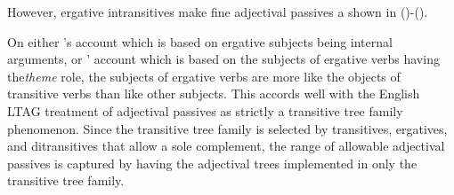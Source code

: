 
However,  ergative intransitives make fine adjectival passives a shown in ()-().



On either \cite{LevinRap}'s account which is based on ergative subjects being internal arguments, or \cite{Bresnan82}' account which is based on the subjects of ergative verbs having the{\it theme} role, the subjects of ergative verbs are more like the objects of transitive verbs than like other subjects.  This accords well with the English LTAG treatment of adjectival passives as strictly a transitive tree family phenomenon.  Since the transitive tree family is selected by transitives, ergatives, and ditransitives that allow a sole complement, the range of allowable adjectival passives is captured by having the adjectival trees implemented in only the transitive tree family.




